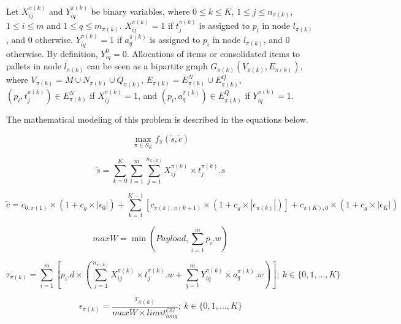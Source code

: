 \documentclass[preprint,authoryear]{elsarticle}
\begin{document}
Let $X_{ij}^{\pi(k)}$ and $Y_{iq}^{\pi(k)}$ be binary variables, where $0 \leq k \leq K$, $1 \leq j \leq n_{\pi(k)}$, $1 \leq i \leq m$ and $1 \leq q \leq m_{\pi(k)}$. $X_{ij}^{\pi(k)} = 1$ if $t_j^{\pi(k)}$ is assigned to $p_i$ in node $l_{\pi(k)}$, and 0 otherwise. $Y_{iq}^{\pi(k)} = 1$ if $a_q^{\pi(k)}$ is assigned to $p_i$ in node $l_{\pi(k)}$, and 0 otherwise. By definition, $Y_{iq}^0=0$. Allocations of items or consolidated items to pallets in node $l_{\pi(k)}$ can be seen as a bipartite graph $G_{\pi(k)}(V_{\pi(k)}, E_{\pi(k)})$, where $V_{\pi(k)} = M \cup N_{\pi(k)} \cup Q_{\pi(k)}$, $E_{\pi(k)} = E^N_{\pi(k)} \cup E^Q_{\pi(k)}$, $(p_i, t_j^{\pi(k)}) \in E^N_{\pi(k)}$ if $X_{ij}^{\pi(k)} = 1$, and $(p_i, a_q^{\pi(k)}) \in E^Q_{\pi(k)}$ if $Y_{iq}^{\pi(k)} = 1$.

The mathematical modeling of this problem is described in the equations below.


\begin{equation} \label{eq:maxf}
	\max_{\pi \in S_K} f_\pi(\tilde{s},\tilde{c})
\end{equation}

\begin{equation} \label{eq:scores}
	\tilde{s} = \sum_{k=0}^{K} \sum_{i=1}^{m} \sum_{j=1}^{n_{\pi(k)}} X_{ij}^{\pi(k)} \times t_j^{\pi(k)}.s
\end{equation}

\begin{equation} \label{eq:costs}
	\tilde{c} = c_{0,\pi(1)}\times(1+c_g\times|\epsilon_0|) + \sum_{k=1}^{K-1} [ c_{\pi(k), \pi(k+1)}\times(1+c_g\times|\epsilon_{\pi(k)}|) ] + c_{\pi(K),0}\times(1+c_g\times|\epsilon_K|)
\end{equation}

\begin{equation} \label{eq:maxW}
	maxW = \min(Payload, \sum_{i=1}^{m}p_i.w)
\end{equation}

\begin{equation} \label{eq:tau}
\tau_{\pi(k)} = \sum_{i=1}^{m}[ p_i.d \times (\sum_{j=1}^{n_{\pi(k)}} X_{ij}^{\pi(k)} \times t_j^{\pi(k)}.w +  \sum_{q=1}^{m} Y_{iq}^{\pi(k)} \times a_q^{\pi(k)}.w)];\ k \in \{0, 1, \ldots, K\}
\end{equation}

\begin{equation} \label{eq:eps}
\epsilon_{\pi(k)} = \frac{\tau_{\pi(k)}}{maxW \times limit^{CG}_{long}};\ k \in \{0, 1, \ldots, K\}
\end{equation}
\end{document}
